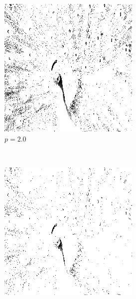 \documentclass{article}
\begin{document}
\begin{enumerate}[label=(\alph*)]
\begin{figure}[!htb]
        \begin{subfigure}[b]{0.3\textwidth}
            \includegraphics[width=\textwidth]{img/PL20.png}
            \caption{$p = 2.0$}
        \end{subfigure}
        ~
        \begin{subfigure}[b]{0.3\textwidth}
            \includegraphics[width=\textwidth]{img/PL25.png}

\end{subfigure}
\end{figure}
\end{enumerate}
\end{document}
